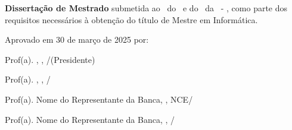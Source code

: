 \thispagestyle{empty}
\makeatletter
\begin{spacing}{1}
\begin{center}

\large \textbf{\@title}

\vspace{1.5cm}
\large \@author

\end{center}

\vspace{0.5cm}

\begin{quoting}[leftmargin=7.0cm, rightmargin=1cm]
\textbf{Dissertação de Mestrado} submetida ao \@programa\ do \@instcomp\ e do \@instncecurto\ da \@faculdade\ - \@faculdadesigla, como parte dos requisitos necessários à obtenção do título de Mestre em Informática.
\end{quoting}

\vspace{1.5cm}
Aprovado em 30 de março de 2025 por:

\vspace{2cm}
\begin{flushright}

\hspace{5cm} \hrulefill

Prof(a). \@orientadora, \@orientadorastitulo, \@progsigla/\@faculdadesigla (Presidente)

\vspace{2cm}
\hspace{5cm} \hrulefill

Prof(a). \@coorientadora, \@orientadorastitulo, \@progsigla/\@faculdadesigla

\vspace{2cm}
\hspace{5cm} \hrulefill

Prof(a). Nome do Representante da Banca, \@orientadorastitulo, NCE/\@faculdadesigla


\vspace{2cm}
\hspace{5cm} \hrulefill

Prof(a). Nome do Representante da Banca, \@orientadorastitulo, \@progsigla/\@faculdadesigla

\end{flushright}

\end{spacing}
\makeatother
\newpage